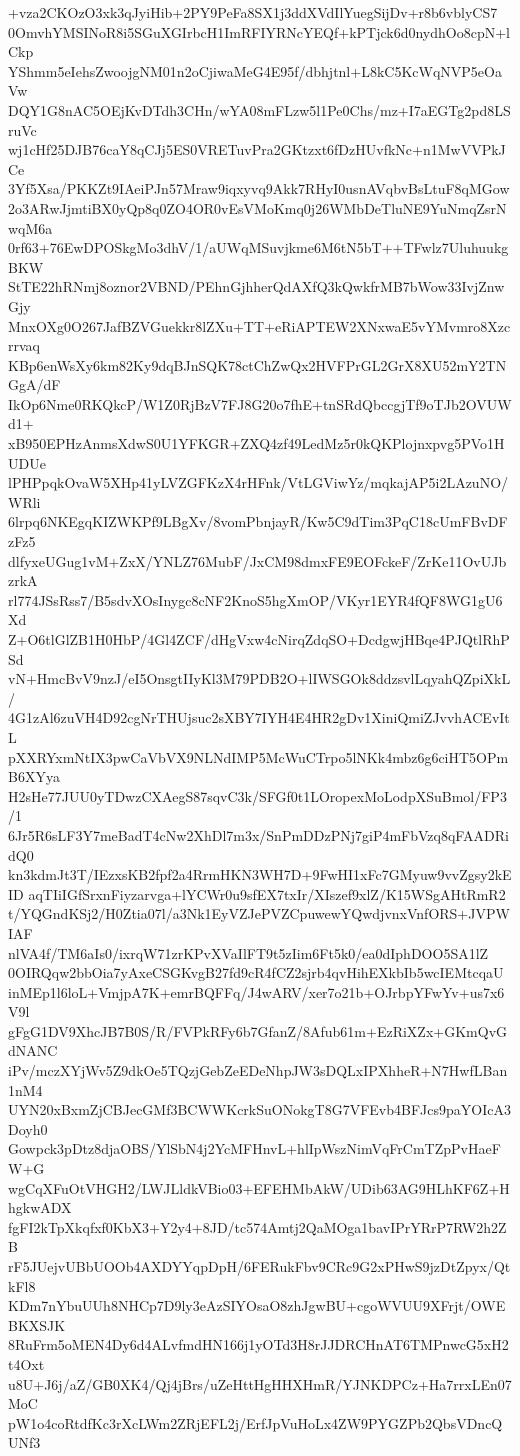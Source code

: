 +vza2CKOzO3xk3qJyiHib+2PY9PeFa8SX1j3ddXVdIlYuegSijDv+r8b6vblyCS7
0OmvhYMSINoR8i5SGuXGIrbcH1ImRFIYRNcYEQf+kPTjck6d0nydhOo8cpN+lCkp
YShmm5eIehsZwoojgNM01n2oCjiwaMeG4E95f/dbhjtnl+L8kC5KcWqNVP5eOaVw
DQY1G8nAC5OEjKvDTdh3CHn/wYA08mFLzw5l1Pe0Chs/mz+I7aEGTg2pd8LSruVc
wj1cHf25DJB76caY8qCJj5ES0VRETuvPra2GKtzxt6fDzHUvfkNc+n1MwVVPkJCe
3Yf5Xsa/PKKZt9IAeiPJn57Mraw9iqxyvq9Akk7RHyI0usnAVqbvBsLtuF8qMGow
2o3ARwJjmtiBX0yQp8q0ZO4OR0vEsVMoKmq0j26WMbDeTluNE9YuNmqZsrNwqM6a
0rf63+76EwDPOSkgMo3dhV/1/aUWqMSuvjkme6M6tN5bT++TFwlz7UluhuukgBKW
StTE22hRNmj8oznor2VBND/PEhnGjhherQdAXfQ3kQwkfrMB7bWow33IvjZnwGjy
MnxOXg0O267JafBZVGuekkr8lZXu+TT+eRiAPTEW2XNxwaE5vYMvmro8Xzcrrvaq
KBp6enWsXy6km82Ky9dqBJnSQK78ctChZwQx2HVFPrGL2GrX8XU52mY2TNGgA/dF
IkOp6Nme0RKQkcP/W1Z0RjBzV7FJ8G20o7fhE+tnSRdQbccgjTf9oTJb2OVUWd1+
xB950EPHzAnmsXdwS0U1YFKGR+ZXQ4zf49LedMz5r0kQKPlojnxpvg5PVo1HUDUe
lPHPpqkOvaW5XHp41yLVZGFKzX4rHFnk/VtLGViwYz/mqkajAP5i2LAzuNO/WRli
6lrpq6NKEgqKIZWKPf9LBgXv/8vomPbnjayR/Kw5C9dTim3PqC18cUmFBvDFzFz5
dlfyxeUGug1vM+ZxX/YNLZ76MubF/JxCM98dmxFE9EOFckeF/ZrKe11OvUJbzrkA
rl774JSsRss7/B5sdvXOsInygc8cNF2KnoS5hgXmOP/VKyr1EYR4fQF8WG1gU6Xd
Z+O6tlGlZB1H0HbP/4Gl4ZCF/dHgVxw4cNirqZdqSO+DcdgwjHBqe4PJQtlRhPSd
vN+HmcBvV9nzJ/eI5OnsgtIIyKl3M79PDB2O+lIWSGOk8ddzsvlLqyahQZpiXkL/
4G1zAl6zuVH4D92cgNrTHUjsuc2sXBY7IYH4E4HR2gDv1XiniQmiZJvvhACEvItL
pXXRYxmNtIX3pwCaVbVX9NLNdIMP5McWuCTrpo5lNKk4mbz6g6ciHT5OPmB6XYya
H2sHe77JUU0yTDwzCXAegS87sqvC3k/SFGf0t1LOropexMoLodpXSuBmol/FP3/1
6Jr5R6sLF3Y7meBadT4cNw2XhDl7m3x/SnPmDDzPNj7giP4mFbVzq8qFAADRidQ0
kn3kdmJt3T/IEzxsKB2fpf2a4RrmHKN3WH7D+9FwHI1xFc7GMyuw9vvZgsy2kEID
aqTIiIGfSrxnFiyzarvga+lYCWr0u9sfEX7txIr/XIszef9xlZ/K15WSgAHtRmR2
t/YQGndKSj2/H0Ztia07l/a3Nk1EyVZJePVZCpuwewYQwdjvnxVnfORS+JVPWIAF
nlVA4f/TM6aIs0/ixrqW71zrKPvXVaIlFT9t5zIim6Ft5k0/ea0dIphDOO5SA1lZ
0OIRQqw2bbOia7yAxeCSGKvgB27fd9cR4fCZ2sjrb4qvHihEXkbIb5wcIEMtcqaU
inMEp1l6loL+VmjpA7K+emrBQFFq/J4wARV/xer7o21b+OJrbpYFwYv+us7x6V9l
gFgG1DV9XhcJB7B0S/R/FVPkRFy6b7GfanZ/8Afub61m+EzRiXZx+GKmQvGdNANC
iPv/mczXYjWv5Z9dkOe5TQzjGebZeEDeNhpJW3sDQLxIPXhheR+N7HwfLBan1nM4
UYN20xBxmZjCBJecGMf3BCWWKcrkSuONokgT8G7VFEvb4BFJcs9paYOIcA3Doyh0
Gowpck3pDtz8djaOBS/YlSbN4j2YcMFHnvL+hlIpWszNimVqFrCmTZpPvHaeFW+G
wgCqXFuOtVHGH2/LWJLldkVBio03+EFEHMbAkW/UDib63AG9HLhKF6Z+HhgkwADX
fgFI2kTpXkqfxf0KbX3+Y2y4+8JD/tc574Amtj2QaMOga1bavIPrYRrP7RW2h2ZB
rF5JUejvUBbUOOb4AXDYYqpDpH/6FERukFbv9CRc9G2xPHwS9jzDtZpyx/QtkFl8
KDm7nYbuUUh8NHCp7D9ly3eAzSIYOsaO8zhJgwBU+cgoWVUU9XFrjt/OWEBKXSJK
8RuFrm5oMEN4Dy6d4ALvfmdHN166j1yOTd3H8rJJDRCHnAT6TMPnwcG5xH2t4Oxt
u8U+J6j/aZ/GB0XK4/Qj4jBrs/uZeHttHgHHXHmR/YJNKDPCz+Ha7rrxLEn07MoC
pW1o4coRtdfKc3rXcLWm2ZRjEFL2j/ErfJpVuHoLx4ZW9PYGZPb2QbsVDncQUNf3
